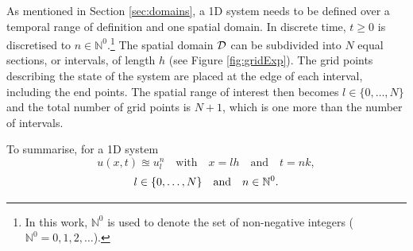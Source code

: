 As mentioned in Section \ref{sec:domains}, a 1D system needs to be defined over a temporal range of definition and one spatial domain.
In discrete time, $t \geq 0$ is discretised to $n \in \mathbb{N}^0$.\footnote{In this work, $\mathbb{N}^0$ is used to denote the set of non-negative integers ($\mathbb{N}^0 = 0, 1, 2, 
\hdots$).} 
The spatial domain $\mathcal{D}$ can be subdivided into $N$ equal sections, or intervals, of length $h$ (see Figure \ref{fig:gridExp}). The grid points describing the state of the system are placed at the edge of each interval, including the end points. The spatial range of interest then becomes $l\in \{0, \hdots, N\}$ and the total number of grid points is $N+1$, which is one more than the number of intervals.




To summarise, for a 1D system
\begin{equation*}
    u(x,t) \approxeq u_l^n \quad \text{with} \quad x=lh \quad \text{and} \quad t = nk,
\end{equation*}
\begin{equation*}
    l\in\{0, \hdots, N\}\quad \text{and} \quad n \in \mathbb{N}^0.
\end{equation*}

